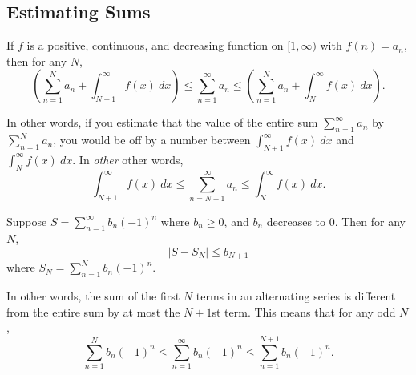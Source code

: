\subsection{Estimating Sums}



\begin{thm}
If $f$ is a positive, continuous, and decreasing function on $[1,\infty)$ with $f(n)=a_n$, then for any $N$,
$$\left(\sum_{n=1}^N a_n+\int_{N+1}^\infty f(x)\ dx \right)
\leq \sum_{n=1}^\infty a_n \leq 
\left(\sum_{n=1}^N a_n+  \int_{N}^\infty f(x)\ dx\right).$$
\end{thm}

In other words, if you estimate that the value of the entire sum $\sum_{n=1}^\infty a_n$ by $\sum_{n=1}^N a_n$, you would be off by a number between $\int_{N+1}^\infty f(x)\ dx$ and $\int_{N}^\infty f(x)\ dx$. In \textit{other} other words,
$$\int_{N+1}^\infty f(x)\ dx \leq \sum_{n=N+1}^\infty a_n \leq  \int_{N}^\infty f(x)\ dx.$$

\begin{thm}

Suppose $S=\sum_{n=1}^\infty b_n (-1)^n$ where $b_n\geq 0$, and $b_n$ decreases to 0. Then for any $N$,
$$\left|S-S_N\right|\leq b_{N+1}$$
where $S_N=\sum_{n=1}^N b_n (-1)^n$.
\end{thm}
In other words, the sum of the first $N$ terms in an alternating series is different from the entire sum by at most the $N+1$st term. This means that for any odd $N$,
$$\sum_{n=1}^N b_n (-1)^n\leq\sum_{n=1}^\infty b_n (-1)^n\leq\sum_{n=1}^{N+1} b_n (-1)^n.$$







